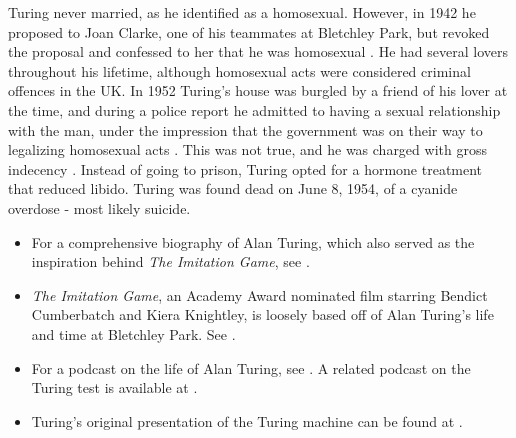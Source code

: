 \documentclass[../../../include/open-logic-section]{subfiles}
\begin{document}
Turing never married, as he identified as a homosexual. However, in 1942 he
proposed to Joan Clarke, one of his teammates at Bletchley Park, but
revoked the proposal and confessed to her that he was homosexual
\citep[259]{Hodges2014}. He had several lovers throughout his lifetime,
although homosexual acts were considered criminal offences in the UK. In
1952 Turing's house was burgled by a friend of his lover at the time, and
during a police report he admitted to having a sexual relationship with the
man, under the impression that the government was on their way to
legalizing homosexual acts \citep[575]{Hodges2014}. This was not true, and
he was charged with gross indecency \citep[576]{Hodges2014}. Instead of
going to prison, Turing opted for a hormone treatment that reduced libido.
Turing was found dead on June 8, 1954, of a cyanide overdose - most likely
suicide.

\begin{reading}
\begin{itemize} 
\item For a comprehensive biography of
Alan Turing, which also served as the inspiration behind \emph{The
Imitation Game}, see \citet{Hodges2014}.

\item \emph{The Imitation Game}, an Academy Award nominated film starring
Bendict Cumberbatch and Kiera Knightley, is loosely based off of Alan
Turing’s life and time at Bletchley Park. See \citet{Imitation2013}.

\item For a podcast on the life of Alan Turing, see \citet{Radiolab2012}. A
related podcast on the Turing test is available at \citet{RadiolabND}.

\item Turing's original presentation of the Turing machine can be found at
\citet{Turing1937}.

\end{itemize}

\end{reading}
\end{document}
